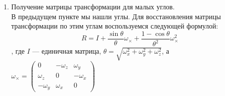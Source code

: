 \documentclass[12pt]{article}
\newenvironment{MyList}[1][4pt]{
  \begin{enumerate}[1.]
  \setlength{\parskip}{0pt}
  \setlength{\itemsep}{#1}
}{       
  \end{enumerate}
}
\begin{document}
\begin{MyList}
		Пусть:
		$$G = 
		\begin{pmatrix} 
		1 & 0 & 0 &  0 &  z & -y \\
		0 & 1 & 0 & -z &  0 &  x \\
		0 & 0 & 1 &  y & -x &  0 \\
		\end{pmatrix},
		\mu = 
		\begin{pmatrix} 
		t_x \\
		t_y \\
		t_z \\
		\omega_x \\
		\omega_y \\
		\omega_z 
		\end{pmatrix}$$
		
		Используя введенные обозначения можем переписать равенство:
		$$T X_H = G \mu + X$$
		
		Теперь перепишем функцию минимизации из 2го пункта:
		$$(P G \mu + P X) \cdot (P G \mu + P X) \rightarrow \min$$
		
		Для нахождения точки минимума возьмем производную и приравняем ее к $0$ (числовые коэффициенты опущены):
		$$G^T P^T (P G \mu + P X) = 0$$
		
		Получаем простое уравнение:
		$$G^T P^T P G \mu = - G^T P^T P X$$
		
		Такое уравнение нетрудно решить. Для учета всех точек достаточно сложить уравнения:
		$$(\sum G^T P^T P G) \mu = - \sum G^T P^T P X$$
		
		\item{Получение матрицы трансформации для малых углов.}\\
		В предыдущем пункте мы нашли углы. Для восстановления матрицы трансформации по этим углам воспользуемся следующей формулой:
		$$ R = I + \frac{\sin{\theta}}{\theta} \omega_{\times} + \frac{1 - \cos{\theta}}{\theta^2} \omega_{\times}^2 $$
		, где $I$ --- единичная матрица, $\theta = \sqrt{\omega_x^2 + \omega_y^2 + \omega_z^2}$, а $\omega_{\times} = 
		\begin{pmatrix} 
		0 & -\omega_z & \omega_y \\
		\omega_z & 0 & -\omega_x \\
		-\omega_y & \omega_x & 0
		\end{pmatrix}$
		

\end{MyList}
\end{document}
